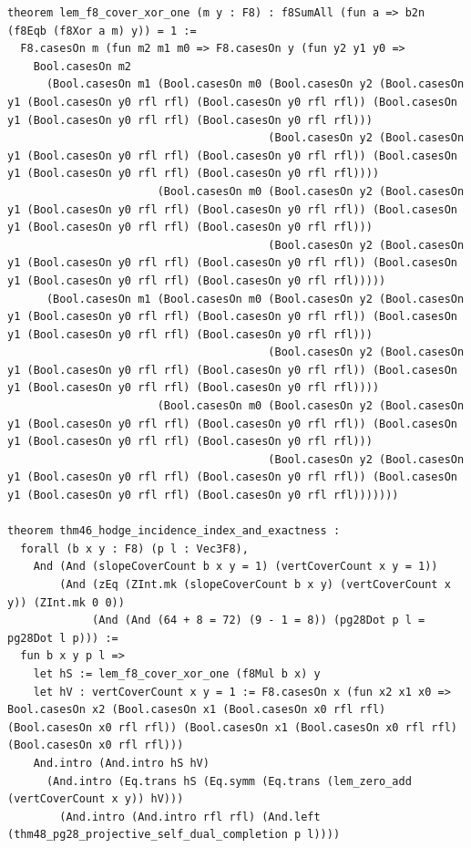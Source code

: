 \documentclass[11pt,letterpaper]{article}
\theoremstyle{spectralthm}
\begin{document}
\begin{lstlisting}[language=Lean4,caption={Standalone Pure Init.Prelude Term-Mode Lean 4 Kernel Suite (thm30--thm61, v0.0.0, 0 sorry, 0 axioms).},label={lst:lean_unified}]
theorem lem_f8_cover_xor_one (m y : F8) : f8SumAll (fun a => b2n (f8Eqb (f8Xor a m) y)) = 1 :=
  F8.casesOn m (fun m2 m1 m0 => F8.casesOn y (fun y2 y1 y0 =>
    Bool.casesOn m2
      (Bool.casesOn m1 (Bool.casesOn m0 (Bool.casesOn y2 (Bool.casesOn y1 (Bool.casesOn y0 rfl rfl) (Bool.casesOn y0 rfl rfl)) (Bool.casesOn y1 (Bool.casesOn y0 rfl rfl) (Bool.casesOn y0 rfl rfl)))
                                        (Bool.casesOn y2 (Bool.casesOn y1 (Bool.casesOn y0 rfl rfl) (Bool.casesOn y0 rfl rfl)) (Bool.casesOn y1 (Bool.casesOn y0 rfl rfl) (Bool.casesOn y0 rfl rfl))))
                       (Bool.casesOn m0 (Bool.casesOn y2 (Bool.casesOn y1 (Bool.casesOn y0 rfl rfl) (Bool.casesOn y0 rfl rfl)) (Bool.casesOn y1 (Bool.casesOn y0 rfl rfl) (Bool.casesOn y0 rfl rfl)))
                                        (Bool.casesOn y2 (Bool.casesOn y1 (Bool.casesOn y0 rfl rfl) (Bool.casesOn y0 rfl rfl)) (Bool.casesOn y1 (Bool.casesOn y0 rfl rfl) (Bool.casesOn y0 rfl rfl)))))
      (Bool.casesOn m1 (Bool.casesOn m0 (Bool.casesOn y2 (Bool.casesOn y1 (Bool.casesOn y0 rfl rfl) (Bool.casesOn y0 rfl rfl)) (Bool.casesOn y1 (Bool.casesOn y0 rfl rfl) (Bool.casesOn y0 rfl rfl)))
                                        (Bool.casesOn y2 (Bool.casesOn y1 (Bool.casesOn y0 rfl rfl) (Bool.casesOn y0 rfl rfl)) (Bool.casesOn y1 (Bool.casesOn y0 rfl rfl) (Bool.casesOn y0 rfl rfl))))
                       (Bool.casesOn m0 (Bool.casesOn y2 (Bool.casesOn y1 (Bool.casesOn y0 rfl rfl) (Bool.casesOn y0 rfl rfl)) (Bool.casesOn y1 (Bool.casesOn y0 rfl rfl) (Bool.casesOn y0 rfl rfl)))
                                        (Bool.casesOn y2 (Bool.casesOn y1 (Bool.casesOn y0 rfl rfl) (Bool.casesOn y0 rfl rfl)) (Bool.casesOn y1 (Bool.casesOn y0 rfl rfl) (Bool.casesOn y0 rfl rfl)))))))

theorem thm46_hodge_incidence_index_and_exactness :
  forall (b x y : F8) (p l : Vec3F8),
    And (And (slopeCoverCount b x y = 1) (vertCoverCount x y = 1))
        (And (zEq (ZInt.mk (slopeCoverCount b x y) (vertCoverCount x y)) (ZInt.mk 0 0))
             (And (And (64 + 8 = 72) (9 - 1 = 8)) (pg28Dot p l = pg28Dot l p))) :=
  fun b x y p l =>
    let hS := lem_f8_cover_xor_one (f8Mul b x) y
    let hV : vertCoverCount x y = 1 := F8.casesOn x (fun x2 x1 x0 => Bool.casesOn x2 (Bool.casesOn x1 (Bool.casesOn x0 rfl rfl) (Bool.casesOn x0 rfl rfl)) (Bool.casesOn x1 (Bool.casesOn x0 rfl rfl) (Bool.casesOn x0 rfl rfl)))
    And.intro (And.intro hS hV)
      (And.intro (Eq.trans hS (Eq.symm (Eq.trans (lem_zero_add (vertCoverCount x y)) hV)))
        (And.intro (And.intro rfl rfl) (And.left (thm48_pg28_projective_self_dual_completion p l))))


\end{lstlisting}
\end{document}

